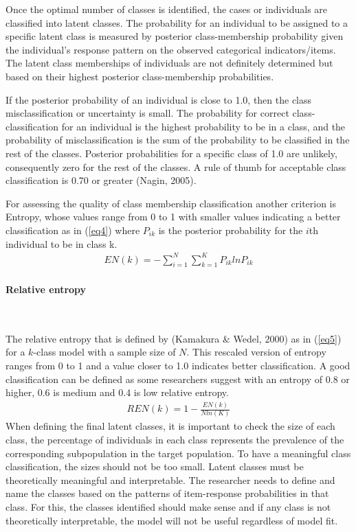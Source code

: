 \documentclass[12pt,a4paper,oneside]{reedthesis}
\begin{document}
Once the optimal number of classes is identified, the cases or individuals are classified into latent classes. The probability for an individual to be assigned to a specific latent class is measured by posterior class-membership probability given the individual's response pattern on the observed categorical indicators/items. The latent class memberships of individuals are not definitely determined but based on their highest posterior class-membership probabilities.

If the posterior probability of an individual is close to 1.0, then the class misclassification or uncertainty is small. The probability for correct class-classification for an individual is the highest probability to be in a class, and the probability of misclassification is the sum of the probability to be classified in the rest of the classes. Posterior probabilities for a specific class of 1.0 are unlikely, consequently zero for the rest of the classes. A rule of thumb for acceptable class classification is 0.70 or greater (Nagin, 2005).

For assessing the quality of class membership classification another criterion is Entropy, whose values range from 0 to 1 with smaller values indicating a better classification as in (\ref{eq4}) where \(P_{ik}\) is the posterior probability for the \(i\)th individual to be in class k.
\begin{align}
EN(k) = - \sum^N_{i=1} \sum^K_{k=1}P_{ik} ln P_{ik} \label{eq4}
\end{align}
\hypertarget{relative-entropy}{%
\paragraph{Relative entropy}\label{relative-entropy}}

~

The relative entropy that is defined by (Kamakura \& Wedel, 2000) as in (\ref{eq5}) for a \(k\)-class model with a sample size of \(N\). This rescaled version of entropy ranges from 0 to 1 and a value closer to 1.0 indicates better classification. A good classification can be defined as some researchers suggest with an entropy of 0.8 or higher, 0.6 is medium and 0.4 is low relative entropy.
\begin{align}
REN(k) = 1-\frac{EN(k)}{N ln(K)} \label{eq5}
\end{align}
When defining the final latent classes, it is important to check the size of each class, the percentage of individuals in each class represents the prevalence of the corresponding subpopulation in the target population. To have a meaningful class classification, the sizes should not be too small.
Latent classes must be theoretically meaningful and interpretable. The researcher needs to define and name the classes based on the patterns of item-response probabilities in that class. For this, the classes identified should make sense and if any class is not theoretically interpretable, the model will not be useful regardless of model fit.
\end{document}
